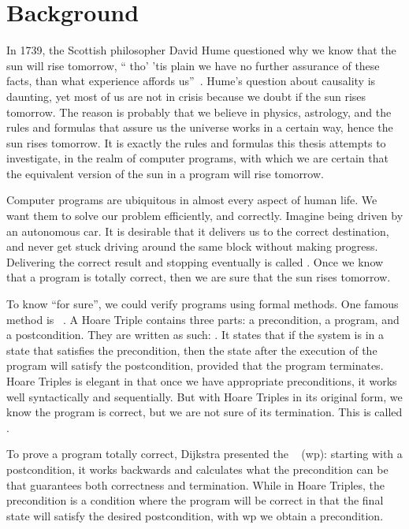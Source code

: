 \chapter{Background}\label{ch:background}


In 1739, the Scottish philosopher David Hume questioned why we know that the sun will rise tomorrow, `` tho' 'tis plain we have no further assurance of these facts, than what experience affords us''~\cite{hume1896}. 
Hume's question about causality is daunting, yet most of us are not in crisis because we doubt if the sun rises tomorrow. 
The reason is probably that we believe in physics, astrology, and the rules and formulas that assure us the universe works in a certain way, hence the sun rises tomorrow. 
It is exactly the rules and formulas this thesis attempts to investigate, in the realm of computer programs, with which we are certain that the equivalent version of the sun in a program will rise tomorrow. 

Computer programs are ubiquitous in almost every aspect of human life. 
We want them to solve our problem efficiently, and correctly. 
Imagine being driven by an autonomous car. It is desirable that it delivers us to the correct destination, and never get stuck driving around the same block without making progress. 
Delivering the correct result and stopping eventually is called . 
Once we know that a program is totally correct, then we are sure that the sun rises tomorrow. 

To know ``for sure'', we could verify programs using formal methods. 
One famous method is ~\cite{hoare69}. 
A Hoare Triple contains three parts: a precondition, a program, and a postcondition. 
They are written as such: .
It states that if the system is in a state that satisfies the precondition, then the state after the execution of the program will satisfy the postcondition, provided that the program terminates.
Hoare Triples is elegant in that once we have appropriate preconditions, it works well syntactically and sequentially. 
But with Hoare Triples in its original form, we know the program is correct, but we are not sure of its termination. 
This is called . 

To prove a program totally correct, Dijkstra presented the ~\cite{dijkstra75} (wp): starting with a postcondition, it works backwards and calculates what the precondition can be that guarantees both correctness and termination. 
While in Hoare Triples, the precondition is a  condition where the program will be correct in that the final state will satisfy the desired postcondition, with wp we obtain a  precondition. 

